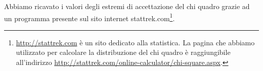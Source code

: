 Abbiamo ricavato i valori degli estremi di accettazione del chi quadro grazie ad un programma presente sul sito internet stattrek.com\footnote{
\url{http://stattrek.com} è un sito dedicato alla statistica. La pagina che abbiamo utilizzato per calcolare la distribuzione del chi quadro
è raggiungibile all'indirizzo \url{http://stattrek.com/online-calculator/chi-square.aspx}.}.
